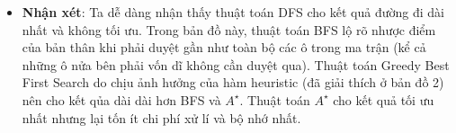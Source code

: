 \documentclass[11pt]{article} %
\begin{document}
\begin{itemize}
\begin{figure}[h]
\begin{tabular}{cc}
		\end{tabular}
	\end{figure}
	\begin{itemize}
		\item \textbf{Nhận xét}: Ta dễ dàng nhận thấy thuật toán DFS cho kết quả đường đi dài nhất và không tối ưu. Trong bản đồ này, thuật toán BFS lộ rõ nhược điểm của bản thân khi phải duyệt gần như toàn bộ các ô trong ma trận (kể cả những ô nửa bên phải vốn dĩ không cần duyệt qua). Thuật toán Greedy Best First Search do chịu ảnh hưởng của hàm heuristic (đã giải thích ở bản đồ 2) nên cho kết qủa dài dài hơn BFS và $A^{\star}$. Thuật toán  $A^{\star}$ cho kết quả tối ưu nhất nhưng lại tốn ít chi phí xử lí và bộ nhớ nhất.
	\end{itemize}
	


\end{itemize}
\end{document}
